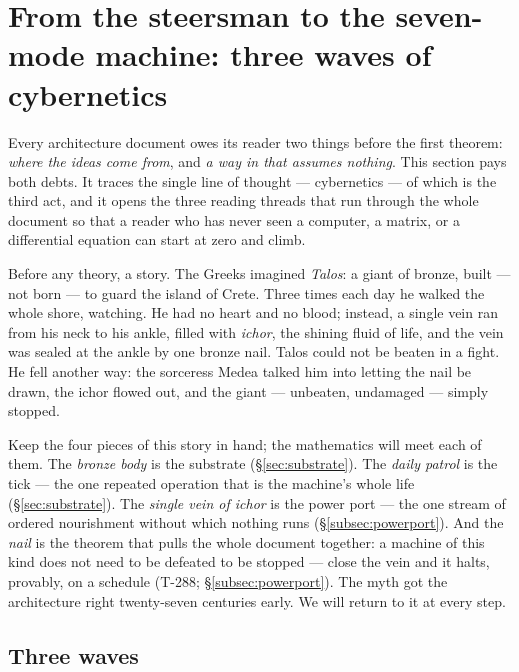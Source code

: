 \section{From the steersman to the seven-mode machine: three waves of cybernetics}
\label{sec:genesis}

Every architecture document owes its reader two things before the first
theorem: \emph{where the ideas come from}, and \emph{a way in that assumes
nothing}. This section pays both debts. It traces the single line of thought
--- cybernetics --- of which \TALOS{} is the third act, and it opens the three
reading threads that run through the whole document so that a reader who has
never seen a computer, a matrix, or a differential equation can start at zero
and climb.

\begin{mythbox}
Before any theory, a story. The Greeks imagined \emph{Talos}: a giant of
bronze, built --- not born --- to guard the island of Crete. Three times each
day he walked the whole shore, watching. He had no heart and no blood;
instead, a single vein ran from his neck to his ankle, filled with
\emph{ichor}, the shining fluid of life, and the vein was sealed at the ankle
by one bronze nail. Talos could not be beaten in a fight. He fell another
way: the sorceress Medea talked him into letting the nail be drawn, the ichor
flowed out, and the giant --- unbeaten, undamaged --- simply stopped.

Keep the four pieces of this story in hand; the mathematics will meet each of
them. The \emph{bronze body} is the substrate (\S\ref{sec:substrate}). The
\emph{daily patrol} is the tick --- the one repeated operation that is the
machine's whole life (\S\ref{sec:substrate}). The \emph{single vein of ichor}
is the power port --- the one stream of ordered nourishment without which
nothing runs (\S\ref{subsec:powerport}). And the \emph{nail} is the theorem
that pulls the whole document together: a machine of this kind does not need
to be defeated to be stopped --- close the vein and it halts, provably, on a
schedule (T-288; \S\ref{subsec:powerport}). The myth got the architecture
right twenty-seven centuries early. We will return to it at every step.
\end{mythbox}

\subsection{Three waves}
\label{subsec:waves}

